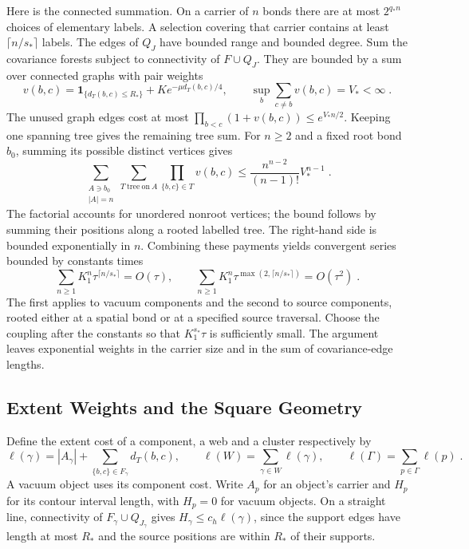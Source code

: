 \documentclass[11pt]{article}
\begin{document}
Here is the connected summation. On a carrier of $n$ bonds there are at most $2^{q_*n}$ choices of elementary labels. A selection covering that carrier contains at least $\lceil n/s_*\rceil$ labels. The edges of $Q_J$ have bounded range and bounded degree. Sum the covariance forests subject to connectivity of $F\cup Q_J$. They are bounded by a sum over connected graphs with pair weights
\begin{equation}\label{eq:marginal-counting-weight}
    v(b,c)=\mathbf1_{\{d_T(b,c)\leq R_*\}}
        +K e^{-\mu d_T(b,c)/4},
    \qquad \sup_b\sum_{c\ne b}v(b,c)=V_*<\infty\;.
\end{equation}
The unused graph edges cost at most $\prod_{b<c}(1+v(b,c))\leq e^{V_*n/2}$. Keeping one spanning tree gives the remaining tree sum. For $n\geq 2$ and a fixed root bond $b_0$, summing its possible distinct vertices gives
\begin{equation}\label{eq:marginal-rooted-tree-count}
    \sum_{\substack{A\ni b_0\\|A|=n}}
        \sum_{T\ \mathrm{tree\ on}\ A}\prod_{\{b,c\}\in T}v(b,c)
        \leq \frac{n^{n-2}}{(n-1)!}V_*^{n-1}\;.
\end{equation}
The factorial accounts for unordered nonroot vertices; the bound follows by summing their positions along a rooted labelled tree. The right-hand side is bounded exponentially in $n$. Combining these payments yields convergent series bounded by constants times
\begin{equation}\label{eq:marginal-load-series}
    \sum_{n\geq 1}K_1^n\tau^{\lceil n/s_*\rceil}=O(\tau),
    \qquad
    \sum_{n\geq 1}K_1^n\tau^{\max(2,\lceil n/s_*\rceil)}=O(\tau^2)\;.
\end{equation}
The first applies to vacuum components and the second to source components, rooted either at a spatial bond or at a specified source traversal. Choose the coupling after the constants so that $K_1^{s_*}\tau$ is sufficiently small. The argument leaves exponential weights in the carrier size and in the sum of covariance-edge lengths.

\subsection{Extent Weights and the Square Geometry}

Define the extent cost of a component, a web and a cluster respectively by
\begin{equation}\label{eq:marginal-extent}
    \ell(\gamma)=|A_\gamma|+
        \sum_{\{b,c\}\in F_\gamma}d_T(b,c),
    \qquad \ell(W)=\sum_{\gamma\in W}\ell(\gamma),
    \qquad \ell(\Gamma)=\sum_{p\in \Gamma}\ell(p)\;.
\end{equation}
A vacuum object uses its component cost. Write $A_p$ for an object's carrier and $H_p$ for its contour interval length, with $H_p=0$ for vacuum objects. On a straight line, connectivity of $F_\gamma\cup Q_{J_\gamma}$ gives $H_\gamma\leq c_h\ell(\gamma)$, since the support edges have length at most $R_*$ and the source positions are within $R_*$ of their supports.
\end{document}
